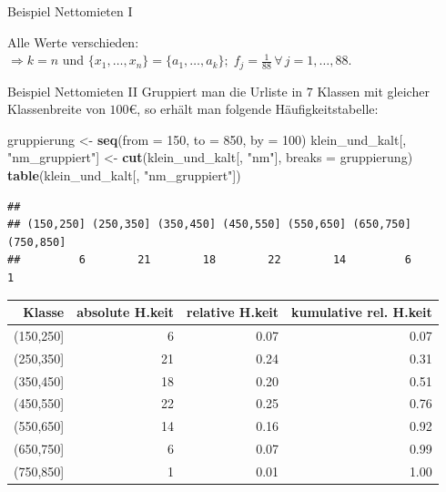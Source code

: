 \documentclass[
  10pt,
  ignorenonframetext,
]{beamer}
\newenvironment{Shaded}{\begin{snugshade}}{\end{snugshade}}
\newcommand{\AttributeTok}[1]{\textcolor[rgb]{0.13,0.29,0.53}{#1}}
\newcommand{\DecValTok}[1]{\textcolor[rgb]{0.00,0.00,0.81}{#1}}
\newcommand{\FunctionTok}[1]{\textcolor[rgb]{0.13,0.29,0.53}{\textbf{#1}}}
\newcommand{\NormalTok}[1]{#1}
\newcommand{\OtherTok}[1]{\textcolor[rgb]{0.56,0.35,0.01}{#1}}
\newcommand{\StringTok}[1]{\textcolor[rgb]{0.31,0.60,0.02}{#1}}
\begin{document}
\begin{frame}[fragile]{Beispiel Nettomieten I}
\normalsize

Alle Werte verschieden:\\
\(\Rightarrow k=n\) und
\(\{x_1 , \ldots , x_n\} = \{a_1 , \ldots , a_k\};\; f_j = \frac{1}{88} \,\forall\,  j = 1, \ldots, 88\).
\end{frame}

\begin{frame}[fragile]{Beispiel Nettomieten II}
\label{beispiel-nettomieten-ii}
Gruppiert man die Urliste in \(7\) Klassen mit gleicher Klassenbreite
von \(100\)€, so erhält man folgende Häufigkeitstabelle:

\scriptsize

\begin{Shaded}
\begin{Highlighting}[]
\NormalTok{gruppierung }\OtherTok{\textless{}{-}} \FunctionTok{seq}\NormalTok{(}\AttributeTok{from =} \DecValTok{150}\NormalTok{, }\AttributeTok{to =} \DecValTok{850}\NormalTok{, }\AttributeTok{by =} \DecValTok{100}\NormalTok{)}
\NormalTok{klein\_und\_kalt[, }\StringTok{"nm\_gruppiert"}\NormalTok{] }\OtherTok{\textless{}{-}} \FunctionTok{cut}\NormalTok{(klein\_und\_kalt[, }\StringTok{"nm"}\NormalTok{], }\AttributeTok{breaks =}\NormalTok{ gruppierung)}
\FunctionTok{table}\NormalTok{(klein\_und\_kalt[, }\StringTok{"nm\_gruppiert"}\NormalTok{])}
\end{Highlighting}
\end{Shaded}

\begin{verbatim}
## 
## (150,250] (250,350] (350,450] (450,550] (550,650] (650,750] (750,850] 
##         6        21        18        22        14         6         1
\end{verbatim}

\normalsize

\normalsize

\begin{table}[ht]
\centering
\begin{tabular}{rrrr}
 Klasse & absolute H.keit & relative H.keit & kumulative rel. H.keit \\ 
  \hline
(150,250] &   6 & 0.07 & 0.07 \\ 
  (250,350] &  21 & 0.24 & 0.31 \\ 
  (350,450] &  18 & 0.20 & 0.51 \\ 
  (450,550] &  22 & 0.25 & 0.76 \\ 
  (550,650] &  14 & 0.16 & 0.92 \\ 
  (650,750] &   6 & 0.07 & 0.99 \\ 
  (750,850] &   1 & 0.01 & 1.00 \\ 
  \end{tabular}
\end{table}
\normalsize
\end{frame}
\end{document}
